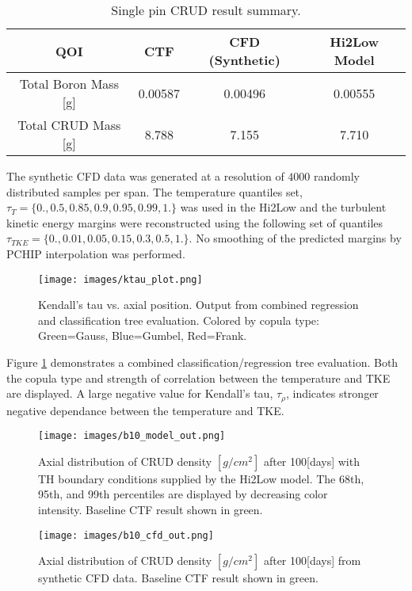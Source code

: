 \begin{table}[h!]
\begin{center}
\begin{tabular}{|c|c|c|c|}
\hline 
 QOI  &   CTF	&  CFD (Synthetic)	& Hi2Low Model \\ \hline
Total Boron Mass [g]& 0.00587	&  0.00496	& 0.00555 \\
Total CRUD Mass [g]	& 8.788	&  7.155 & 7.710	\\
\hline
\end{tabular}
\caption{Single pin CRUD result summary.}
\label{tab:crud_res}
\end{center}
\end{table}
The synthetic CFD data was generated at a resolution of $4000$ randomly distributed samples per span.
The temperature quantiles set, $\tau_T = \{0., 0.5, 0.85, 0.9, 0.95, 0.99, 1.\}$ was used in the Hi2Low and the turbulent kinetic energy margins were reconstructed using the following set of quantiles $\tau_{TKE} = \{ 0., 0.01, 0.05, 0.15, 0.3, 0.5, 1.\}$.  No smoothing of the predicted margins by PCHIP interpolation was performed.

\begin{figure}[hbtp]
\centering
\texttt{[image: images/ktau\_plot.png]}
\caption{Kendall's tau vs. axial position. Output from combined regression and classification tree evaluation. Colored by copula type: Green=Gauss, Blue=Gumbel, Red=Frank.}
\label{fig:ktau_plot}
\end{figure}

Figure \ref{fig:ktau_plot} demonstrates a combined classification/regression tree evaluation.  Both the copula type and strength of correlation between the temperature and TKE are displayed.  A large negative value for Kendall's tau, $\tau_\rho$, indicates stronger negative dependance between the temperature and TKE. 

\begin{figure}[hbtp]
\centering
\texttt{[image: images/b10\_model\_out.png]}
\caption{Axial distribution of CRUD  density $[g/cm^2]$ after 100[days] with TH boundary conditions supplied by the Hi2Low model. The 68th, 95th, and 99th percentiles are displayed by decreasing color intensity. Baseline CTF result shown in green.}
\label{fig:b10_model_out}
\end{figure}

\begin{figure}[hbtp]
\centering
\texttt{[image: images/b10\_cfd\_out.png]}
\caption{Axial distribution of CRUD  density $[g/cm^2]$ after 100[days] from synthetic CFD data. Baseline CTF result shown in green.}
\label{fig:b10_cfd_out}
\end{figure}

